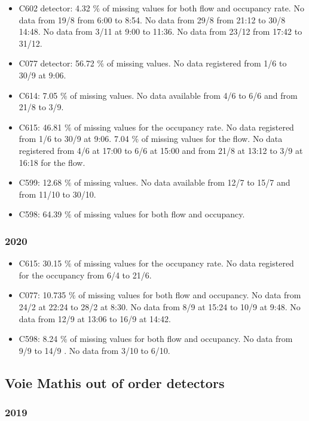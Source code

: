 \documentclass[11pt]{article}
\begin{document}
    \begin{itemize}
\item
  C602 detector: 4.32 \(\%\) of missing values for both flow and
  occupancy rate. No data from 19/8 from 6:00 to 8:54. No data from 29/8
  from 21:12 to 30/8 14:48. No data from 3/11 at 9:00 to 11:36. No data
  from 23/12 from 17:42 to 31/12.
\item
  C077 detector: 56.72 \(\%\) of missing values. No data registered from
  1/6 to 30/9 at 9:06.
\item
  C614: 7.05 \(\%\) of missing values. No data available from 4/6 to 6/6
  and from 21/8 to 3/9.
\item
  C615: 46.81 \(\%\) of missing values for the occupancy rate. No data
  registered from 1/6 to 30/9 at 9:06. 7.04 \(\%\) of missing values for
  the flow. No data registered from 4/6 at 17:00 to 6/6 at 15:00 and
  from 21/8 at 13:12 to 3/9 at 16:18 for the flow.
\item
  C599: 12.68 \(\%\) of missing values. No data available from 12/7 to
  15/7 and from 11/10 to 30/10.
\item
  C598: 64.39 \(\%\) of missing values for both flow and occupancy.
\end{itemize}

    \hypertarget{section}{%
\subsubsection{2020}\label{section}}

    \begin{itemize}
\item
  C615: 30.15 \(\%\) of missing values for the occupancy rate. No data
  registered for the occupancy from 6/4 to 21/6.
\item
  C077: 10.735 \(\%\) of missing values for both flow and occupancy. No
  data from 24/2 at 22:24 to 28/2 at 8:30. No data from 8/9 at 15:24 to
  10/9 at 9:48. No data from 12/9 at 13:06 to 16/9 at 14:42.
\item
  C598: 8.24 \(\%\) of missing values for both flow and occupancy. No
  data from 9/9 to 14/9 . No data from 3/10 to 6/10.
\end{itemize}

    \subsection{Voie Mathis out of order detectors}

    \hypertarget{section}{%
\subsubsection{2019}\label{section}}
\end{document}
